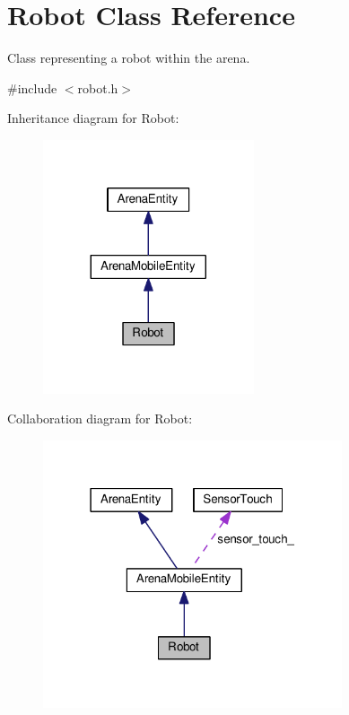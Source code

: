 \hypertarget{classRobot}{}\section{Robot Class Reference}
\label{classRobot}


Class representing a robot within the arena.  




{\ttfamily \#include $<$robot.\+h$>$}



Inheritance diagram for Robot\+:
\nopagebreak
\begin{figure}[H]
\begin{center}
\leavevmode
\includegraphics[width=176pt]{classRobot__inherit__graph}
\end{center}
\end{figure}


Collaboration diagram for Robot\+:
\nopagebreak
\begin{figure}[H]
\begin{center}
\leavevmode
\includegraphics[width=250pt]{classRobot__coll__graph}
\end{center}
\end{figure}
